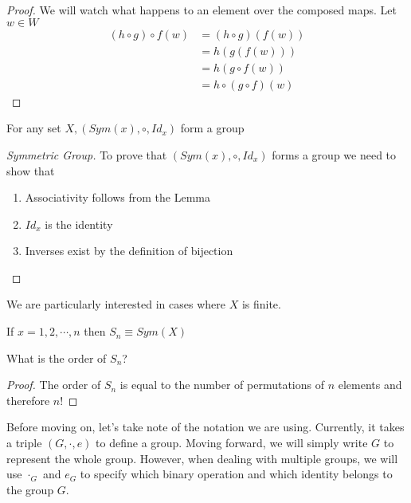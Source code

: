 \documentclass{article}
\begin{document}
\begin{proof}
    We will watch what happens to an element over the composed maps. Let $w \in W$
    \begin{align*}
        (h \circ g) \circ f (w) &= (h \circ g)(f(w)) \\
        &= h(g(f(w))) \\
        &= h(g \circ f(w)) \\
        &= h \circ (g \circ f)(w)
    \end{align*}
\end{proof}

\begin{prop}
    For any set $X, (Sym(x), \circ, Id_x)$ form a group
\end{prop}

\begin{proof}[Symmetric Group]
    To prove that $(Sym(x), \circ, Id_x)$ forms a group we need to show that
    \begin{enumerate}
        \item Associativity follows from the Lemma
        \item $Id_x$ is the identity
        \item Inverses exist by the definition of bijection
    \end{enumerate}
\end{proof}

We are particularly interested in cases where $X$ is finite.
\begin{defi}[$S_n$]
    If $x = {1, 2, \cdots, n}$ then $S_n \equiv Sym(X)$
\end{defi}

\begin{ex}
    What is the order of $S_n$?
\end{ex}

\begin{proof}
    The order of $S_n$ is equal to the number of permutations of $n$ elements and therefore $n!$
\end{proof}

\begin{remark}
    Before moving on, let's take note of the notation we are using. Currently, it takes a triple $(G, \cdot, e)$ to define a group. Moving forward, we will simply write $G$ to represent the whole group. However, when dealing with multiple groups, we will use $\cdot_G$ and $e_G$ to specify which binary operation and which identity belongs to the group $G$.
\end{remark}
\end{document}

